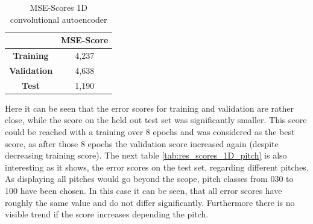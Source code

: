 \begin{table}[htb!]
    \centering
    \begin{tabular}{|c|c|}
        \hline
         & \textbf{MSE-Score} \\
         \hline
        \textbf{Training} & 4,237 \\
        \hline
        \textbf{Validation} & 4,638 \\
        \hline
        \textbf{Test} & 1,190 \\
        \hline
    \end{tabular}
    \caption{MSE-Scores 1D convolutional autoencoder}%
    \label{tab:res_scores_1Dcae}
\end{table}

Here it can be seen that the error scores for training and validation are rather close, while the score on the held out test set was significantly smaller. This score could be reached with a training over 8 epochs and was considered as the best score, as after those 8 epochs the validation score increased again (despite decreasing training score). The next table \ref{tab:res_scores_1D_pitch} is also interesting as it shows, the error scores on the test set, regarding different pitches. As displaying all pitches would go beyond the scope, pitch classes from 030 to 100 have been chosen. In this case it can be seen, that all error scores have roughly the same value and do not differ significantly. Furthermore there is no visible trend if the score increases depending the pitch.

